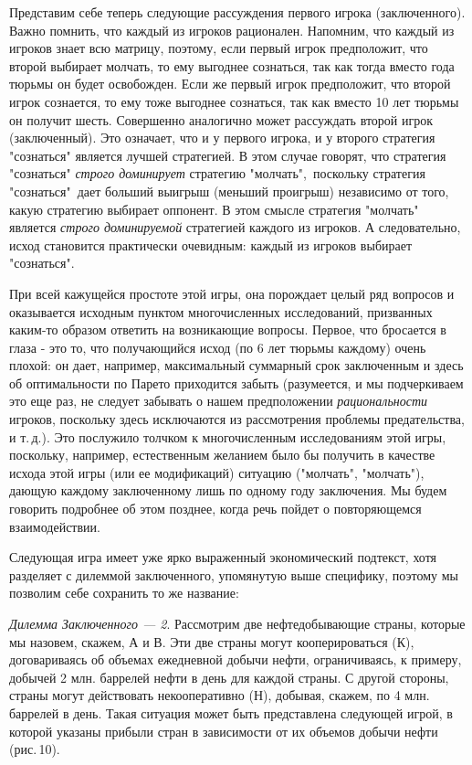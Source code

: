 Представим себе теперь следующие рассуждения первого игрока
(заключенного). Важно помнить, что каждый из игроков рационален.
Напомним, что каждый из игроков знает всю матрицу, поэтому, если
первый игрок предположит, что второй выбирает молчать, то ему
выгоднее сознаться, так как тогда вместо года тюрьмы он будет
освобожден. Если же первый игрок предположит, что второй игрок
сознается, то ему тоже выгоднее сознаться, так как вместо 10 лет
тюрьмы он получит шесть. Совершенно аналогично может рассуждать
второй игрок (заключенный). Это означает, что и у первого игрока,
и у второго стратегия "сознаться" является лучшей стратегией. В
этом случае говорят, что стратегия "сознаться" \emph{строго
доминирует} стратегию "молчать",\, поскольку стратегия
"сознаться"\, дает больший выигрыш (меньший проигрыш) независимо
от того, какую стратегию выбирает оппонент. В этом смысле
стратегия "молчать" является \emph{строго доминируемой} стратегией
каждого из игроков. А следовательно, исход становится практически
очевидным: каждый из игроков выбирает "сознаться".

При всей кажущейся простоте этой игры, она порождает целый ряд
вопросов и оказывается исходным пунктом многочисленных
исследований, призванных каким-то образом ответить на возникающие
вопросы. Первое, что бросается в глаза - это то, что получающийся
исход (по 6 лет тюрьмы каждому) очень плохой: он дает, например,
максимальный суммарный срок заключенным и здесь об оптимальности
по Парето приходится забыть (разумеется, и мы подчеркиваем это еще
раз, не следует забывать о нашем предположении {\it
рациональности} игроков, поскольку здесь исключаются из
рассмотрения проблемы предательства, и т.\,д.). Это послужило
толчком к многочисленным исследованиям этой игры, поскольку,
например, естественным желанием было бы получить в качестве исхода
этой игры (или ее модификаций) ситуацию ("молчать", "молчать"),
дающую каждому заключенному лишь по одному году заключения. Мы
будем говорить подробнее об этом позднее, когда речь пойдет о
повторяющемся взаимодействии.

Следующая игра имеет уже ярко выраженный экономический подтекст,
хотя разделяет с дилеммой заключенного, упомянутую выше специфику,
поэтому мы позволим себе сохранить то же название:

{\it Дилемма Заключенного --- 2}. Рассмотрим две нефтедобывающие
страны, которые мы назовем, скажем, А и В.  Эти две страны могут
кооперироваться (К), договариваясь об объемах ежедневной добычи
нефти, ограничиваясь, к примеру, добычей 2 млн. баррелей нефти в
день для каждой страны. С другой стороны, страны могут действовать
некооперативно (Н), добывая, скажем, по 4 млн. баррелей в день.
Такая ситуация может быть представлена следующей игрой, в которой
указаны прибыли стран в зависимости от их объемов добычи нефти
(рис.\,10).

